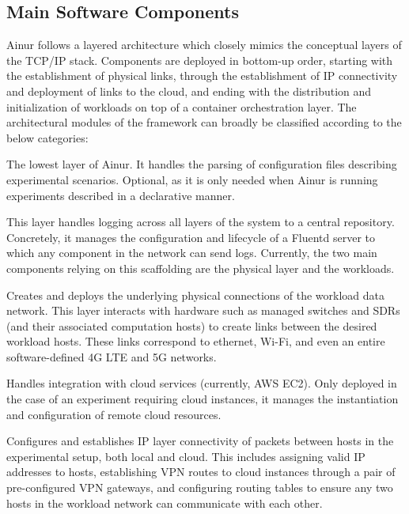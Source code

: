 \subsection{Main Software Components}

Ainur follows a layered architecture which closely mimics the conceptual layers of the \gls{TCP}/\gls{IP} stack.
Components are deployed in bottom-up order, starting with the establishment of physical links, through the establishment of \gls{IP} connectivity and deployment of links to the cloud, and ending with the distribution and initialization of workloads on top of a container orchestration layer.
The architectural modules of the framework can broadly be classified according to the below categories:

\begin{description}[]
    \item[Configuration Layer:]
    The lowest layer of Ainur.
    It handles the parsing of configuration files describing experimental scenarios.
    Optional, as it is only needed when Ainur is running experiments described in a declarative manner.

    \item[Logging layer:]
    This layer handles logging across all layers of the system to a central repository.
    Concretely, it manages the configuration and lifecycle of a Fluentd server to which any component in the network can send logs.
    Currently, the two main components relying on this scaffolding are the physical layer and the workloads.
    
    \item[Physical Layer:] 
    Creates and deploys the underlying physical connections of the workload data network.
    This layer interacts with hardware such as managed switches and \glspl{SDR} (and their associated computation hosts) to create links between the desired workload hosts.
    These links correspond to ethernet, Wi-Fi, and even an entire software-defined 4G \gls{LTE} and 5G networks.

    \item[Cloud Layer:]
    Handles integration with cloud services (currently, \gls{AWS} \gls{EC2}).
    Only deployed in the case of an experiment requiring cloud instances, it manages the instantiation and configuration of remote cloud resources.

    \item[\gls{IP} Layer:]
    Configures and establishes \gls{IP} layer connectivity of packets between hosts in the experimental setup, both local and cloud.
    This includes assigning valid \gls{IP} addresses to hosts, establishing \gls{VPN} routes to cloud instances through a pair of pre-configured \gls{VPN} gateways, and configuring routing tables to ensure any two hosts in the workload network can communicate with each other.


\end{description}
